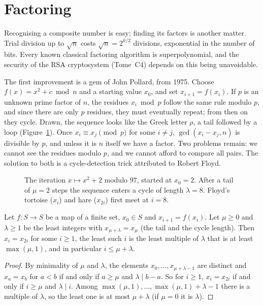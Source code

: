 \section{Factoring}\label{sec:factoring}

Recognising a composite number is easy; finding its factors is another matter. Trial division up to $\sqrt n$ costs $\sqrt n=2^{k/2}$ divisions, exponential in the number of bits. Every known classical factoring algorithm is superpolynomial, and the security of the RSA cryptosystem (Tome~C4) depends on this being unavoidable.

The first improvement is a gem of John Pollard, from 1975. Choose $f(x)=x^2+c\bmod n$ and a starting value $x_0$, and set $x_{i+1}=f(x_i)$. If $p$ is an unknown prime factor of $n$, the residues $x_i\bmod p$ follow the same rule modulo $p$, and since there are only $p$ residues, they must eventually repeat; from then on they cycle. Drawn, the sequence looks like the Greek letter $\rho$, a tail followed by a loop (Figure~\ref{fig:rho}).
Once $x_i\equiv x_j\pmod p$ for some $i\ne j$, $\gcd(x_i-x_j,n)$ is divisible by $p$, and unless it is $n$ itself we have a factor. Two problems remain: we cannot see the residues modulo $p$, and we cannot afford to compare all pairs. The solution to both is a cycle-detection trick attributed to Robert Floyd.

\begin{figure}[ht]
\centering
{}
\caption{The iteration $x\mapsto x^2+2$ modulo $97$, started at $x_0=2$. After a tail of $\mu=2$ steps the sequence enters a cycle of length $\lambda=8$. Floyd's tortoise ($x_i$) and hare ($x_{2i}$) first meet at $i=8$.}
\label{fig:rho}
\end{figure}

\begin{proposition}\label{prop:floyd}
Let $f:S\to S$ be a map of a finite set, $x_0\in S$ and $x_{i+1}=f(x_i)$. Let $\mu\ge0$ and $\lambda\ge1$ be the least integers with $x_{\mu+\lambda}=x_\mu$ (the tail and the cycle length). Then $x_i=x_{2i}$ for some $i\ge1$, the least such $i$ is the least multiple of $\lambda$ that is at least $\max(\mu,1)$, and in particular $i\le\mu+\lambda$.
\end{proposition}
\begin{proof}
By minimality of $\mu$ and $\lambda$, the elements $x_0,\dots,x_{\mu+\lambda-1}$ are distinct and $x_a=x_b$ for $a<b$ if and only if $a\ge\mu$ and $\lambda\mid b-a$. So for $i\ge1$, $x_i=x_{2i}$ if and only if $i\ge\mu$ and $\lambda\mid i$. Among $\max(\mu,1),\dots,\max(\mu,1)+\lambda-1$ there is a multiple of $\lambda$, so the least one is at most $\mu+\lambda$ (if $\mu=0$ it is $\lambda$).
\end{proof}

